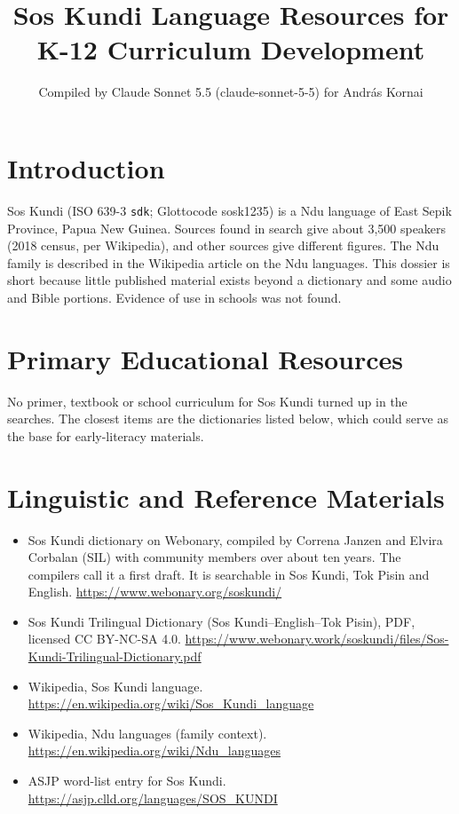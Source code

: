 \documentclass[12pt]{article}
\title{Sos Kundi Language Resources for K-12 Curriculum Development}
\author{Compiled by Claude Sonnet 5.5 (claude-sonnet-5-5) for Andr\'as Kornai}
\date{}
\begin{document}
\maketitle

\section{Introduction}
Sos Kundi (ISO 639-3 \texttt{sdk}; Glottocode sosk1235) is a Ndu language of East Sepik Province, Papua New Guinea. Sources found in search give about 3,500 speakers (2018 census, per Wikipedia), and other sources give different figures. The Ndu family is described in the Wikipedia article on the Ndu languages. This dossier is short because little published material exists beyond a dictionary and some audio and Bible portions. Evidence of use in schools was not found.

\section{Primary Educational Resources}
No primer, textbook or school curriculum for Sos Kundi turned up in the searches. The closest items are the dictionaries listed below, which could serve as the base for early-literacy materials.

\section{Linguistic and Reference Materials}
\begin{itemize}
\item Sos Kundi dictionary on Webonary, compiled by Correna Janzen and Elvira Corbalan (SIL) with community members over about ten years. The compilers call it a first draft. It is searchable in Sos Kundi, Tok Pisin and English. \url{https://www.webonary.org/soskundi/}
\item Sos Kundi Trilingual Dictionary (Sos Kundi--English--Tok Pisin), PDF, licensed CC BY-NC-SA 4.0. \url{https://www.webonary.work/soskundi/files/Sos-Kundi-Trilingual-Dictionary.pdf}
\item Wikipedia, Sos Kundi language. \url{https://en.wikipedia.org/wiki/Sos_Kundi_language}
\item Wikipedia, Ndu languages (family context). \url{https://en.wikipedia.org/wiki/Ndu_languages}
\item ASJP word-list entry for Sos Kundi. \url{https://asjp.clld.org/languages/SOS_KUNDI}
\end{itemize}
\end{document}
